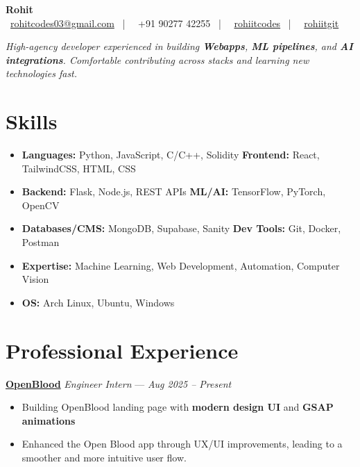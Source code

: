 \documentclass[a4paper,10pt]{article}
\begin{document}
\begin{center}
    {\Huge \bfseries \color{primaryblue}Rohit} \\[0.3em]
    \small
    \faEnvelope~\href{mailto:rohitcodes03@gmail.com}{rohitcodes03@gmail.com} ~|~ 
    \faPhone~+91 90277 42255 ~|~
    \faLinkedin~\href{https://www.linkedin.com/in/rohiitcodes/}{rohiitcodes} ~|~
    \faGithub~\href{https://github.com/rohiitgit/}{rohiitgit}
\end{center}

\vspace{0.4em}
\noindent \textit{High-agency developer experienced in building \textbf{Webapps}, \textbf{ML pipelines}, and \textbf{AI integrations}. Comfortable contributing across stacks and learning new technologies fast.}

\section*{Skills}
\begin{itemize}
  \item \textbf{Languages:} Python, JavaScript, C/C++, Solidity \quad \textbf{Frontend:} React, TailwindCSS, HTML, CSS
  \item \textbf{Backend:} Flask, Node.js, REST APIs \quad \textbf{ML/AI:} TensorFlow, PyTorch, OpenCV
  \item \textbf{Databases/CMS:} MongoDB, Supabase, Sanity \quad \textbf{Dev Tools:} Git, Docker, Postman
  \item \textbf{Expertise:} Machine Learning, Web Development, Automation, Computer Vision
  \item \textbf{OS:} Arch Linux, Ubuntu, Windows
\end{itemize}

\section*{Professional Experience}

\noindent\textbf{\href{https://www.linkedin.com/company/openblood/posts/?feedView=all}{OpenBlood}} 
\hfill \textit{Engineer Intern} — \textit{Aug 2025 – Present}
\begin{itemize}
  \item Building OpenBlood landing page with \textbf{modern design UI } and \textbf{GSAP animations}
  \item Enhanced the Open Blood app through UX/UI improvements, leading to a smoother and more intuitive user flow.
\end{itemize}
\vspace{0.4em}
\end{document}

